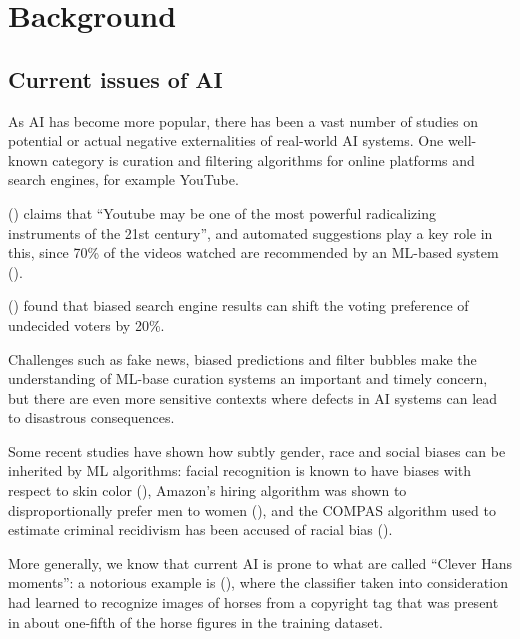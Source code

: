 \documentclass[conference]{IEEEtran}
\begin{document}
\section{Background}
\label{sec:background}

\subsection{Current issues of AI}
\label{sec:opaque}

As AI has become more popular, there has been a vast number of studies on
potential or actual negative externalities of real-world AI systems. One
well-known category is curation and filtering algorithms for online platforms
and search engines, for example YouTube.

(\cite{tufekci2018youtube}) claims that ``Youtube may be one of the most powerful
radicalizing instruments of the 21st century'', and automated suggestions play a
key role in this, since 70\% of the videos watched are recommended by an
ML-based system  (\cite{solsman}).

(\cite{epstein}) found that biased search engine results can shift the voting
preference of undecided voters by 20\%.

Challenges such as fake news, biased predictions and filter bubbles make the
understanding of ML-base curation systems an important and timely concern, but
there are even more sensitive contexts where defects in AI systems can lead to
disastrous consequences.

Some recent studies have shown how subtly gender, race and social biases can be
inherited by ML algorithms: facial recognition is known to have biases with
respect to skin color (\cite{buolamwini2018gender}), Amazon's hiring algorithm
was shown to disproportionally prefer men to women (\cite{hiring}), and the
COMPAS algorithm used to estimate criminal recidivism has been accused of racial
bias (\cite{compas}).

More generally, we know that current AI is prone to what are called ``Clever
Hans moments'': a notorious example is (\cite{cleverhans}), where the classifier
taken into consideration had learned to recognize images of horses from a copyright tag that was present in about one-fifth of the horse figures in
the training dataset.
\end{document}
